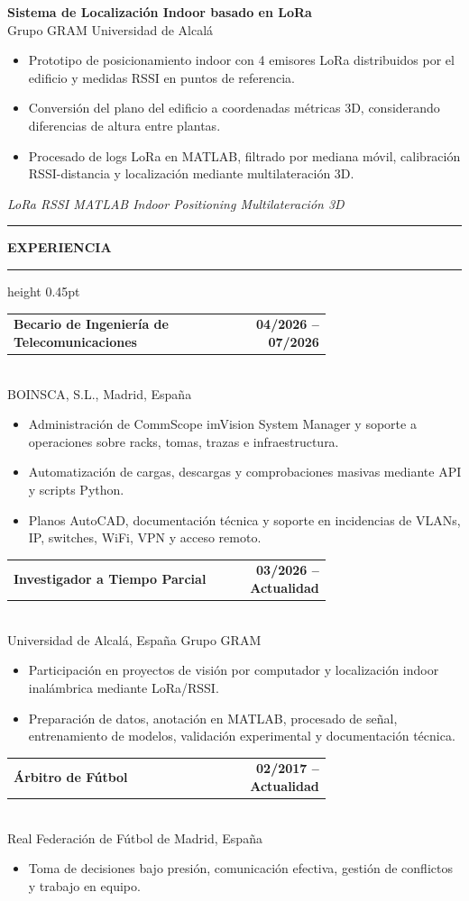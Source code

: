 \documentclass[9pt,a4paper]{article}
\makeatletter
\newcommand{\cvsection}[1]{%
  \vspace{3pt}
  {\color{accent}\rule{7pt}{7pt}}\hspace{4pt}
  {\bfseries\color{navy}\scriptsize #1}
  \vspace{1pt}
  {\color{linegray}\hrule height 0.45pt}
  \vspace{2pt}
}
\newcommand{\entry}[3]{%
  \begin{tabular*}{\linewidth}{@{}p{0.70\linewidth}@{\extracolsep{\fill}}r@{}}
  \textbf{\color{navy}#1} & {\scriptsize\bfseries\color{accent}#2}
  \end{tabular*}\\[-2pt]
  {\scriptsize\color{muted}#3}
  \vspace{1.5pt}
}
\newcommand{\project}[2]{%
  \textbf{\color{navy}#1}\\[-1pt]
  {\scriptsize\color{amber}#2}\\[-2pt]
}
\newcommand{\tags}[1]{%
  {\scriptsize\color{muted}\textit{#1}}\vspace{1.5pt}
}
\makeatother
\begin{document}
\begin{minipage}[t]{0.66\textwidth}
\project{Sistema de Localización Indoor basado en LoRa}{Grupo GRAM \textperiodcentered{} Universidad de Alcalá}
\begin{itemize}
\item Prototipo de posicionamiento indoor con 4 emisores LoRa distribuidos por el edificio y medidas RSSI en puntos de referencia.
\item Conversión del plano del edificio a coordenadas métricas 3D, considerando diferencias de altura entre plantas.
\item Procesado de logs LoRa en MATLAB, filtrado por mediana móvil, calibración RSSI-distancia y localización mediante multilateración 3D.
\end{itemize}
\tags{LoRa \textperiodcentered{} RSSI \textperiodcentered{} MATLAB \textperiodcentered{} Indoor Positioning \textperiodcentered{} Multilateración 3D}

\cvsection{EXPERIENCIA}

\entry{Becario de Ingeniería de Telecomunicaciones}{04/2026 -- 07/2026}{BOINSCA, S.L., Madrid, España}
\begin{itemize}
\item Administración de CommScope imVision System Manager y soporte a operaciones sobre racks, tomas, trazas e infraestructura.
\item Automatización de cargas, descargas y comprobaciones masivas mediante API y scripts Python.
\item Planos AutoCAD, documentación técnica y soporte en incidencias de VLANs, IP, switches, WiFi, VPN y acceso remoto.
\end{itemize}

\entry{Investigador a Tiempo Parcial}{03/2026 -- Actualidad}{Universidad de Alcalá, España \textperiodcentered{} Grupo GRAM}
\begin{itemize}
\item Participación en proyectos de visión por computador y localización indoor inalámbrica mediante LoRa/RSSI.
\item Preparación de datos, anotación en MATLAB, procesado de señal, entrenamiento de modelos, validación experimental y documentación técnica.
\end{itemize}

\entry{Árbitro de Fútbol}{02/2017 -- Actualidad}{Real Federación de Fútbol de Madrid, España}
\begin{itemize}
\item Toma de decisiones bajo presión, comunicación efectiva, gestión de conflictos y trabajo en equipo.
\end{itemize}


\end{minipage}
\end{document}
